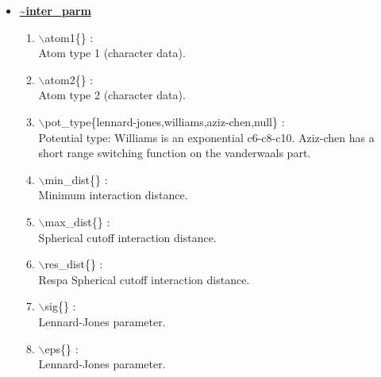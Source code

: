 \documentclass[12pt]{article}
\begin{document}
\begin{itemize}

\clearpage
\huge
\item[] \underline{\bf \~{}inter\_parm}
\begin{enumerate}

 \vspace{0.15in} \Large
 \item  $\backslash$atom1\{\} : \\ 
    \large
    Atom type 1 (character data).

 \vspace{0.15in} \Large
 \item  $\backslash$atom2\{\} : \\ 
    \large
    Atom type 2 (character data).

 \vspace{0.15in} \Large
 \item  $\backslash$pot\_type\{lennard-jones,williams,aziz-chen,null\} : \\ 
    \large
    Potential type: Williams is an exponential c6-c8-c10. Aziz-chen has
    a short range switching function on the vanderwaals part.

 \vspace{0.15in} \Large
 \item  $\backslash$min\_dist\{\} : \\ 
    \large
    Minimum interaction distance.

 \vspace{0.15in} \Large
 \item  $\backslash$max\_dist\{\} : \\ 
    \large
    Spherical cutoff interaction distance.

 \vspace{0.15in} \Large
 \item  $\backslash$res\_dist\{\} : \\ 
    \large
    Respa Spherical cutoff interaction distance.

 \vspace{0.15in} \Large
 \item  $\backslash$sig\{\} : \\ 
    \large
    Lennard-Jones parameter.

 \vspace{0.15in} \Large
 \item  $\backslash$eps\{\} : \\ 
    \large
    Lennard-Jones parameter.


\end{enumerate}
\end{itemize}
\end{document}
